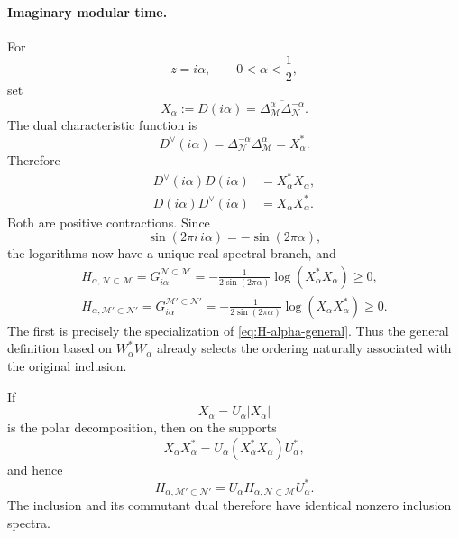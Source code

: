 \documentclass[a4paper,11pt]{article}
\theoremstyle{definition}
\newcommand{\mN}{\mathcal{N}}
\newcommand{\mM}{\mathcal{M}}
\begin{document}
\paragraph{Imaginary modular time.}
For
\begin{equation}
    z=i\alpha,
    \qquad
    0<\alpha<\frac12,
\end{equation}
set
\begin{equation}
    X_\alpha
    :=
    D(i\alpha)
    =
    \overline{
    \Delta_{\mM}^\alpha
    \Delta_{\mN}^{-\alpha}} .
    \label{eq:X-alpha-common}
\end{equation}
The dual characteristic function is
\begin{equation}
    D^\vee(i\alpha)
    =
    \overline{
    \Delta_{\mN}^{-\alpha}
    \Delta_{\mM}^\alpha}
    =
    X_\alpha^* .
    \label{eq:Ddual-alpha-common}
\end{equation}
Therefore
\begin{align}
    D^\vee(i\alpha)D(i\alpha)
    &=
    X_\alpha^*X_\alpha,
    \label{eq:XX-original}
    \\
    D(i\alpha)D^\vee(i\alpha)
    &=
    X_\alpha X_\alpha^* .
    \label{eq:XX-dual}
\end{align}
Both are positive contractions. Since
\begin{equation}
    \sin(2\pi i\,i\alpha)
    =
    -\sin(2\pi\alpha),
\end{equation}
the logarithms now have a unique real spectral branch, and
\begin{align}
    \boxed{
    H_{\alpha,\mN\subset\mM}
    =
    G_{i\alpha}^{\mN\subset\mM}
    =
    -\frac{1}{2\sin(2\pi\alpha)}
    \log(X_\alpha^*X_\alpha)
    \geq0,
    }
    \label{eq:Halpha-original-common}
    \\
    \boxed{
    H_{\alpha,\mM'\subset\mN'}
    =
    G_{i\alpha}^{\mM'\subset\mN'}
    =
    -\frac{1}{2\sin(2\pi\alpha)}
    \log(X_\alpha X_\alpha^*)
    \geq0.
    }
    \label{eq:Halpha-dual-common}
\end{align}
The first is precisely the specialization of
\eqref{eq:H-alpha-general}. Thus the general definition based on
$W_\alpha^*W_\alpha$ already selects the ordering naturally associated with
the original inclusion.

If
\begin{equation}
    X_\alpha
    =
    U_\alpha|X_\alpha|
\end{equation}
is the polar decomposition, then on the supports
\begin{equation}
    X_\alpha X_\alpha^*
    =
    U_\alpha
    (X_\alpha^*X_\alpha)
    U_\alpha^*,
\end{equation}
and hence
\begin{equation}
    \boxed{
    H_{\alpha,\mM'\subset\mN'}
    =
    U_\alpha
    H_{\alpha,\mN\subset\mM}
    U_\alpha^* .
    }
    \label{eq:H-dual-polar}
\end{equation}
The inclusion and its commutant dual therefore have identical nonzero
inclusion spectra.
\end{document}
